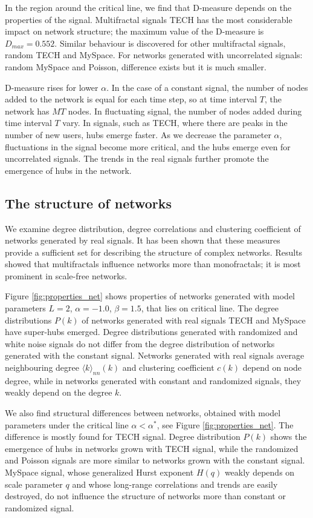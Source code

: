 In the region around the critical line, we find that D-measure depends on the properties of the signal. Multifractal signals TECH has the most considerable impact on network structure; the maximum value of the D-measure is $D_{max}=0.552$. Similar behaviour is discovered for other multifractal signals, random TECH and MySpace. For networks generated with uncorrelated signals: random MySpace and Poisson, difference exists but it is much smaller.

D-measure rises for lower $\alpha$. In the case of a constant signal, the number of nodes added to the network is equal for each time step, so at time interval $T$, the network has $MT$ nodes. In fluctuating signal, the number of nodes added during time interval $T$ vary. In signals, such as TECH, where there are peaks in the number of new users, hubs emerge faster. As we decrease the parameter $\alpha$, fluctuations in the signal become more critical, and the hubs emerge even for uncorrelated signals. The trends in the real signals further promote the emergence of hubs in the network.  

\subsection{The structure of networks}

We examine degree distribution, degree correlations and clustering coefficient of networks generated by real signals. It has been shown that these measures provide a sufficient set for describing the structure of complex networks. Results showed that multifractals influence networks more than monofractals; it is most prominent in scale-free networks. 

Figure \ref{fig:properties_net} shows properties of networks generated with model parameters $L=2$, $\alpha=-1.0$, $\beta=1.5$, that lies on critical line.  The degree distributions $P(k)$ of networks generated with real signals TECH and MySpace have super-hubs emerged. Degree distributions generated with randomized and white noise signals do not differ from the degree distribution of networks generated with the constant signal. Networks generated with real signals average neighbouring degree $\langle k\rangle_{nn}(k)$ and clustering coefficient $c(k)$ depend on node degree, while in networks generated with constant and randomized signals, they weakly depend on the degree $k$.

We also find structural differences between networks, obtained with model parameters under the critical line $\alpha<\alpha^{*}$, see Figure \ref{fig:properties_net}. The difference is mostly found for TECH signal. Degree distribution $P(k)$ shows the emergence of hubs in networks grown with TECH signal, while the randomized and Poisson signals are more similar to networks grown with the constant signal. MySpace signal, whose generalized Hurst exponent $H(q)$ weakly depends on scale parameter $q$ and whose long-range correlations and trends are easily destroyed, do not influence the structure of networks more than constant or randomized signal.   


